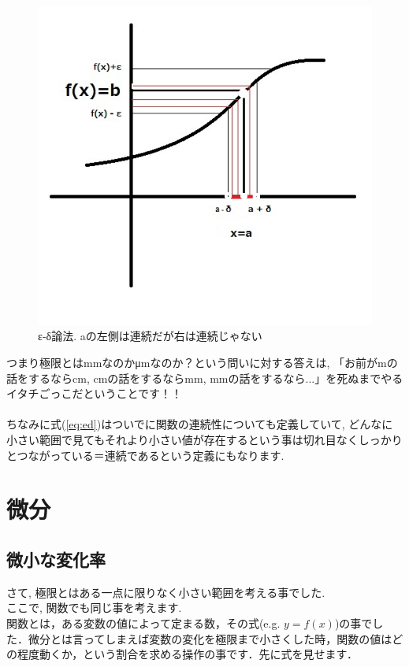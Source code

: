 \documentclass[11pt,a4paper]{jreport}
\begin{document}
\begin{figure}[H]
\label{im:ed}
  \centering
  \includegraphics[width=120mm,bb=0 0 510 487]{../figures/ed.jpg}
  \caption{ε-δ論法. aの左側は連続だが右は連続じゃない}
\end{figure}

つまり極限とはmmなのかμmなのか？という問いに対する答えは, 「お前がmの話をするならcm, cmの話をするならmm, mmの話をするなら...」を死ぬまでやるイタチごっこだということです！！\\
\\
ちなみに式(\ref{eq:ed})はついでに関数の連続性についても定義していて, どんなに小さい範囲で見てもそれより小さい値が存在するという事は切れ目なくしっかりとつながっている＝連続であるという定義にもなります.\\
\section{微分}
\subsection{微小な変化率}
さて, 極限とはある一点に限りなく小さい範囲を考える事でした.\\
ここで, 関数でも同じ事を考えます.\\

関数とは，ある変数の値によって定まる数，その式(e.g. $y = f(x)$)の事でした．微分とは言ってしまえば変数の変化を極限まで小さくした時，関数の値はどの程度動くか，という割合を求める操作の事です．先に式を見せます．
\end{document}
